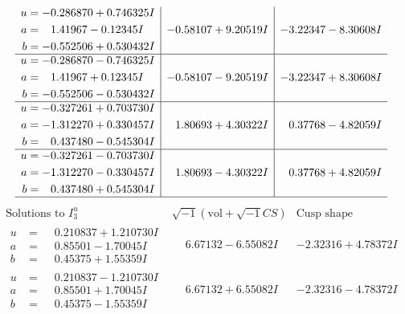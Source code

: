 \documentclass[1p]{elsarticle_modified}
\theoremstyle{definition}
\newcommand{\I}{\sqrt{-1}}
\begin{document}
$$\begin{array}{c|c|c}
\begin{aligned}
u &= -0.286870 + 0.746325 I \\
a &= \phantom{-}1.41967 - 0.12345 I \\
b &= -0.552506 + 0.530432 I\end{aligned}
 & -0.58107 + 9.20519 I & -3.22347 - 8.30608 I \\ \hline\begin{aligned}
u &= -0.286870 - 0.746325 I \\
a &= \phantom{-}1.41967 + 0.12345 I \\
b &= -0.552506 - 0.530432 I\end{aligned}
 & -0.58107 - 9.20519 I & -3.22347 + 8.30608 I \\ \hline\begin{aligned}
u &= -0.327261 + 0.703730 I \\
a &= -1.312270 + 0.330457 I \\
b &= \phantom{-}0.437480 - 0.545304 I\end{aligned}
 & \phantom{-}1.80693 + 4.30322 I & \phantom{-}0.37768 - 4.82059 I \\ \hline\begin{aligned}
u &= -0.327261 - 0.703730 I \\
a &= -1.312270 - 0.330457 I \\
b &= \phantom{-}0.437480 + 0.545304 I\end{aligned}
 & \phantom{-}1.80693 - 4.30322 I & \phantom{-}0.37768 + 4.82059 I\\
 \hline 
 \end{array}$$\newpage$$\begin{array}{c|c|c}  
\text{Solutions to }I^u_{3}& \I (\text{vol} + \sqrt{-1}CS) & \text{Cusp shape}\\
 \hline 
\begin{aligned}
u &= \phantom{-}0.210837 + 1.210730 I \\
a &= \phantom{-}0.85501 - 1.70045 I \\
b &= \phantom{-}0.45375 + 1.55359 I\end{aligned}
 & \phantom{-}6.67132 - 6.55082 I & -2.32316 + 4.78372 I \\ \hline\begin{aligned}
u &= \phantom{-}0.210837 - 1.210730 I \\
a &= \phantom{-}0.85501 + 1.70045 I \\
b &= \phantom{-}0.45375 - 1.55359 I\end{aligned}
 & \phantom{-}6.67132 + 6.55082 I & -2.32316 - 4.78372 I \\ \hline\begin{aligned}

\end{aligned}
\end{array}$$
\end{document}
